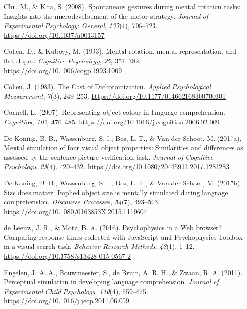 \documentclass[
  man,mask,floatsintext]{apa7}
\newlength{\cslhangindent}
\newlength{\cslentryspacingunit} %
\newenvironment{CSLReferences}[2] %
 {%
  \setlength{\parindent}{0pt}
  \ifodd #1
  \let\oldpar\par
  \def\par{\hangindent=\cslhangindent\oldpar}
  \fi
  \setlength{\parskip}{#2\cslentryspacingunit}
 }%
 {}
\begin{document}
\begin{CSLReferences}{1}{0}
\leavevmode{}%
Chu, M., \& Kita, S. (2008). Spontaneous gestures during mental rotation tasks: {Insights} into the microdevelopment of the motor strategy. \emph{Journal of Experimental Psychology: General}, \emph{137}(4), 706--723. \url{https://doi.org/10.1037/a0013157}

\leavevmode{}%
Cohen, D., \& Kubovy, M. (1993). Mental rotation, mental representation, and flat slopes. \emph{Cognitive Psychology}, \emph{25}, 351--382. \url{https://doi.org/10.1006/cogp.1993.1009}

\leavevmode{}%
Cohen, J. (1983). The Cost of Dichotomization. \emph{Applied Psychological Measurement}, \emph{7}(3), 249--253. \url{https://doi.org/10.1177/014662168300700301}

\leavevmode{}%
Connell, L. (2007). Representing object colour in language comprehension. \emph{Cognition}, \emph{102}, 476--485. \url{https://doi.org/10.1016/j.cognition.2006.02.009}

\leavevmode{}%
De Koning, B. B., Wassenburg, S. I., Bos, L. T., \& Van der Schoot, M. (2017a). Mental simulation of four visual object properties: Similarities and differences as assessed by the sentence-picture verification task. \emph{Journal of Cognitive Psychology}, \emph{29}(4), 420--432. \url{https://doi.org/10.1080/20445911.2017.1281283}

\leavevmode{}%
De Koning, B. B., Wassenburg, S. I., Bos, L. T., \& Van der Schoot, M. (2017b). Size does matter: {Implied} object size is mentally simulated during language comprehension. \emph{Discourse Processes}, \emph{54}(7), 493--503. \url{https://doi.org/10.1080/0163853X.2015.1119604}

\leavevmode{}%
de Leeuw, J. R., \& Motz, B. A. (2016). Psychophysics in a {Web} browser? {Comparing} response times collected with {JavaScript} and {Psychophysics Toolbox} in a visual search task. \emph{Behavior Research Methods}, \emph{48}(1), 1--12. \url{https://doi.org/10.3758/s13428-015-0567-2}

\leavevmode{}%
Engelen, J. A. A., Bouwmeester, S., de Bruin, A. B. H., \& Zwaan, R. A. (2011). Perceptual simulation in developing language comprehension. \emph{Journal of Experimental Child Psychology}, \emph{110}(4), 659--675. \url{https://doi.org/10.1016/j.jecp.2011.06.009}


\end{CSLReferences}
\end{document}
